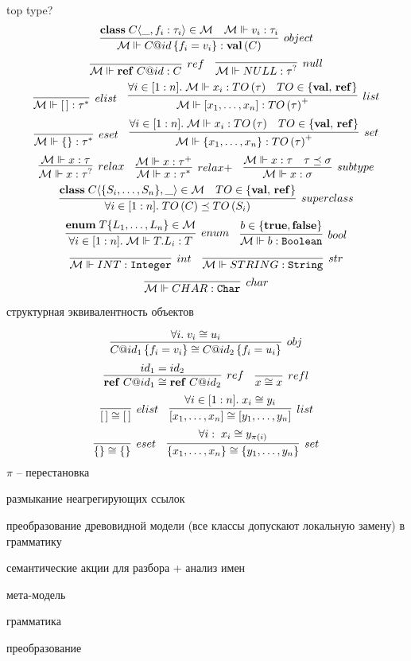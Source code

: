 top type?
\newcommand{\classf}[3]{\mathbf{class}\; #1 \langle #2, #3\rangle}
\newcommand{\type}[2]{#1\left(#2\right)}
\newcommand{\valts}{\mathbf{val}}
\newcommand{\valt}[1]{\type{\valts}{#1}}
\newcommand{\refts}{\mathbf{ref}}
\newcommand{\reft}[1]{\type{\refts}{#1}}
\newcommand{\refv}[2]{\mathbf{ref}\; #1@#2}
\newcommand{\reference}[3]{\mathbf{#1}\langle #2 : #3\rangle}
\newcommand{\attribute}[2]{\mathbf{attr}\langle #1 : #2\rangle}
\newcommand{\obj}[3]{#1@#2\left\{#3\right\}}
\newcommand{\fromMM}{\MM{M} \Vdash}
$$
	\infer[object]{
		\fromMM \obj{C}{id}{f_i = v_i} : \valt{C}
	}{
		\classf{C}{\_}{f_i : \tau_i} \in \MM{M}&
		\fromMM v_i : \tau_i
	}
$$
$$
\infer[ref]{
	\fromMM \refv{C}{id} : C
}{}
\quad
\infer[null]{
	\fromMM NULL : \tau^?
}{}
$$
$$
\infer[elist]{
	\fromMM [\,] : \tau^*
}{}
\quad
\infer[list]{
	\fromMM [x_1, \ldots, x_n] : \type{TO}{\tau}^+
}{
	\forall i\in[1:n]. \; \fromMM x_i : \type{TO}{\tau} &
	TO \in \{\valts,\, \refts\}
}
$$
$$
\infer[eset]{
	\fromMM \{\} : \tau^*
}{}
\quad
\infer[set]{
	\fromMM \{x_1, \ldots, x_n\} : \type{TO}{\tau}^+
}{
	\forall i\in[1:n]. \; \fromMM x_i : \type{TO}{\tau} &
	TO \in \{\valts,\, \refts\}
}
$$
$$
\infer[relax]{
	\fromMM x : \tau^?
}{
	\fromMM x : \tau
}
\quad
\infer[relax+]{
	\fromMM x : \tau^*
}{
	\fromMM x : \tau^+
}
\quad
\infer[subtype]{
	\fromMM x : \sigma
}{
	\fromMM x : \tau &
	\tau \subtype \sigma
}
$$
$$
\infer[superclass]{
	\forall i \in [1:n].\; \type{TO}{C} \subtype \type{TO}{S_i}
}{
	\classf{C}{\{S_i, \ldots, S_n\}}{\_} \in \MM{M} &
	TO \in \{\valts,\, \refts\}
}
$$
$$
\infer[enum]{
	\forall i \in [1:n]. \; \fromMM T.L_i : T
}{
	\mathbf{enum}\;T\{L_1,\ldots,L_n\} \in \MM{M}
}
\quad
\infer[bool]{
	\fromMM b : \mathtt{Boolean}
}{
	b \in \{\mathbf{true}, \mathbf{false}\}
}
$$
$$
\infer[int]{\fromMM INT : \mathtt{Integer}}{}
\quad
\infer[str]{\fromMM STRING : \mathtt{String}}{}
$$
$$
\infer[char]{\fromMM CHAR : \mathtt{Char}}{}
$$

структурная эквивалентность объектов

$$
\infer[obj]{
	\obj{C}{id_1}{f_i = v_i} \cong \obj{C}{id_2}{f_i = u_i}
}{
	\forall i. \; v_i \cong u_i
}
$$
$$
\infer[ref]{
	\refv{C}{id_1} \cong \refv{C}{id_2}
}{
	id_1 = id_2
}
\quad
\infer[refl]{x \cong x}{}
$$
$$
\infer[elist]{[\,] \cong [\,]}{}
\quad
\infer[list]{
	[x_1,\ldots,x_n] \cong [y_1,\ldots,y_n]
}{
	\forall i \in [1:n]. \; x_i \cong y_i
}
$$
$$
\infer[eset]{\{\} \cong \{\}}{}
\quad
\infer[set]{
	\{x_1,\ldots,x_n\} \cong \{y_1,\ldots,y_n\}
}{
	\forall i :\; x_i \cong y_{\pi(i)}
}
$$
$\pi$ -- перестановка

размыкание неагрегирующих ссылок

преобразование древовидной модели (все классы допускают локальную замену) в грамматику

семантические акции для разбора + анализ имен

мета-модель

грамматика

преобразование
